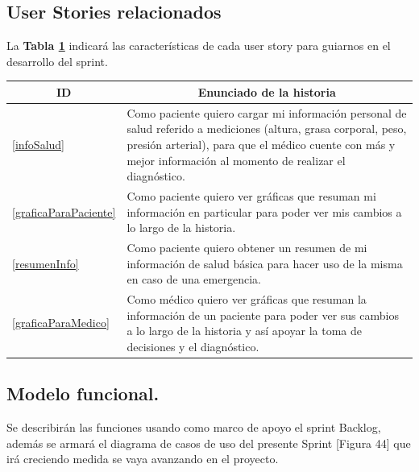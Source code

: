 \documentclass[a4paper,12pt]{article}
\begin{document}
\subsection{User Stories relacionados}
La \textbf{Tabla \ref{US-Sprint3} } indicará las características de cada user story para guiarnos en el desarrollo del sprint.

\begin{table}[h]
    \label{US-Sprint3}
    \centering
	\begin{tabular}{|l|p{14cm}|}
	\hline
        \multicolumn{1}{|c|}{\textbf{ID}} &
        \multicolumn{1}{|c|}{\textbf{Enunciado de la historia}} \\          
    \hline
       \ref{infoSalud} &
       Como paciente quiero cargar mi información personal de salud referido a mediciones (altura, grasa corporal, peso, presión arterial), para que el médico cuente con más y mejor información al momento de realizar el diagnóstico. 
    
       
       \\
       \hline
	    \ref{graficaParaPaciente} &
	    Como paciente quiero ver gráficas que resuman mi información en particular para poder ver mis cambios a lo largo de la historia. 

	    
	    \\
	    \hline
	    \ref{resumenInfo} &
	    Como paciente quiero obtener un resumen de mi información de salud básica para hacer uso de la misma en caso de una emergencia. 

	    
	    \\
	   \hline      
        \ref{graficaParaMedico} & Como médico quiero ver gráficas que resuman la información de un paciente para poder ver sus cambios a lo largo de la historia y así apoyar la toma de decisiones y el diagnóstico.\\
    \hline
    \end{tabular}

\end{table}

\subsection{ Modelo funcional.} 
Se describirán las funciones usando como marco de apoyo el sprint Backlog,
además se armará el diagrama de casos de uso del presente Sprint [Figura 44] que
irá creciendo medida se vaya avanzando en el proyecto.

\end{document}
